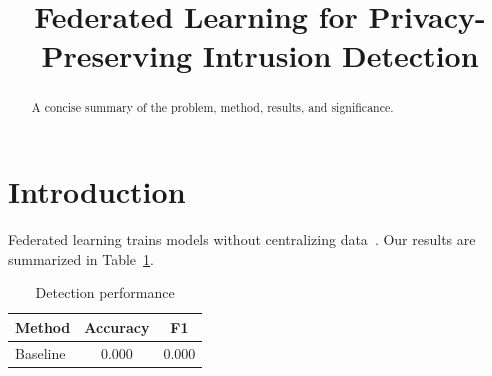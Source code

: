 \documentclass[conference]{IEEEtran}
\title{Federated Learning for Privacy-Preserving Intrusion Detection}
\author{\IEEEauthorblockN{Your Name}
        \IEEEauthorblockA{Your University\\ you@university.edu}}
\begin{document}
\maketitle

\begin{abstract}
A concise summary of the problem, method, results, and significance.
\end{abstract}

\section{Introduction}
Federated learning trains models without centralizing data~\cite{mcmahan2017communication}.
Our results are summarized in Table~\ref{tab:results}.

\begin{table}[t]
  \caption{Detection performance}\label{tab:results}
  \centering
  \begin{tabular}{lcc}
    Method & Accuracy & F1 \\ \hline
    Baseline & 0.000 & 0.000 \\
  \end{tabular}
\end{table}


\end{document}
